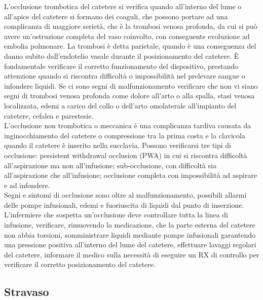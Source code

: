 L’occlusione trombotica del catetere si verifica quando all’interno del lume o all’apice del catetere si formano dei 
coaguli, che possono portare ad una complicanza di maggiore serietà, che è la trombosi venosa profonda, da cui si può 
avere un’ostruzione completa del vaso coinvolto, con conseguente evoluzione ad embolia polmonare. La trombosi è 
detta parietale, quando è una conseguenza del danno subito dall'endotelio vasale durante il posizionamento del 
catetere. È fondamentale verificare il corretto funzionamento del dispositivo, prestando attenzione quando si 
riscontra difficoltà o impossibilità nel prelevare sangue o infondere liquidi. Se ci sono segni di malfunzionamento 
verificare che non vi siano segni di trombosi venosa profonda come dolore all’arto o alla spalla, stasi venosa 
localizzata, edemi a carico del collo o dell’arto omolaterale all’impianto del catetere, cefalea e parestesie.\\
L’occlusione non trombotica o meccanica è una complicanza tardiva causata da inginocchiamento del catetere o 
compressione tra la prima costa e la clavicola quando il catetere è inserito nella succlavia. Possono verificarsi 
tre tipi di occlusione: persistent withdrawal occlusion (PWA) in cui si riscontra difficoltà all’aspirazione ma non 
all’infusione; sub-occlusione, con difficoltà sia all’aspirazione che all’infusione; occlusione completa con 
impossibilità ad aspirare e ad infondere\cite{AIOMCVC}.\\
Segni e sintomi di occlusione sono oltre al malfunzionamento, possibili allarmi delle pompe infusionali, edemi e 
fuoriuscita di liquidi dal punto di inserzione. L’infermiere che sospetta un’occlusione deve controllare tutta la 
linea di infusione, verificare, rimuovendo la medicazione, che la parte esterna del catetere non abbia torsioni, 
somministrare liquidi mediante pompe infusionali garantendo una pressione positiva all’interno del lume del catetere, 
effettuare lavaggi regolari del catetere, informare il medico sulla necessità di eseguire un RX di controllo per 
verificare il corretto posizionamento del catetere.\\

\subsection{Stravaso}

